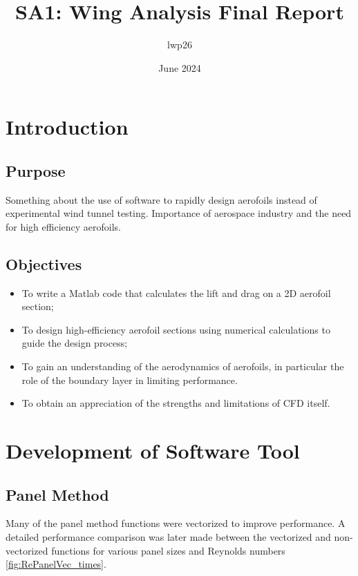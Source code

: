 \documentclass{article}
\begin{document}
\title{SA1: Wing Analysis Final Report}
\author{lwp26}
\date{June 2024}
\maketitle 

\section{Introduction}

\subsection{Purpose}

Something about the use of software to rapidly design aerofoils instead of experimental wind tunnel testing.
Importance of aerospace industry and the need for high efficiency aerofoils.

\subsection{Objectives}

\begin{itemize}
    \item To write a Matlab code that calculates the lift and drag on a 2D aerofoil section;
    \item To design high-efficiency aerofoil sections using numerical calculations to guide the design process;
    \item To gain an understanding of the aerodynamics of aerofoils, in particular the role of the boundary layer in limiting performance.
    \item To obtain an appreciation of the strengths and limitations of CFD itself.
\end{itemize}

\section{Development of Software Tool}

\subsection{Panel Method}

Many of the panel method functions were vectorized to improve performance.
A detailed performance comparison was later made between the vectorized and non-vectorized functions for various panel sizes and Reynolds numbers \ref{fig:RePanelVec_times}.
\end{document}
